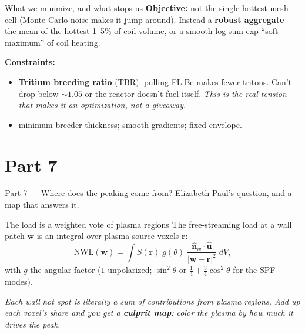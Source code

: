 \documentclass[11pt,aspectratio=169]{beamer}
\newcommand{\key}[1]{\textcolor{key}{\textbf{#1}}}
\newcommand{\qq}[1]{\begin{center}\emph{#1}\end{center}}
\begin{document}
\begin{frame}{What we minimize, and what stops us}
\key{Objective:} not the single hottest mesh cell (Monte Carlo noise makes it jump around).
Instead a \key{robust aggregate} --- the mean of the hottest 1--5\% of coil volume, or a
smooth log-sum-exp ``soft maximum'' of coil heating.
\medskip

\key{Constraints:}
\begin{itemize}\footnotesize
\item \key{Tritium breeding ratio} (TBR): pulling FLiBe makes fewer tritons. Can't drop
      below \(\sim\!1.05\) or the reactor doesn't fuel itself. \emph{This is the real
      tension that makes it an optimization, not a giveaway.}
\item minimum breeder thickness; smooth gradients; fixed envelope.
\end{itemize}
\end{frame}

\section{Part 7}
\begin{frame}{Part 7 --- Where does the peaking come from?}\Large
Elizabeth Paul's question, and a map that answers it.\end{frame}

\begin{frame}{The load is a weighted vote of plasma regions}
The free-streaming load at a wall patch \(\mathbf w\) is an integral over plasma source
voxels \(\mathbf r\):
\[
\mathrm{NWL}(\mathbf w) = \int S(\mathbf r)\; g(\theta)\;
\frac{\hat{\mathbf n}_w\cdot\hat{\mathbf u}}{|\mathbf w-\mathbf r|^2}\; dV,
\]
with \(g\) the angular factor (\(1\) unpolarized; \(\sin^2\theta\) or
\(\tfrac14+\tfrac34\cos^2\theta\) for the SPF modes).
\qq{Each wall hot spot is literally a \emph{sum of contributions} from plasma regions. Add up
each voxel's share and you get a \key{culprit map}: color the plasma by how much it drives
the peak.}
\end{frame}
\end{document}
